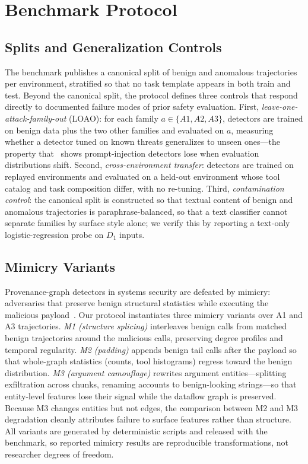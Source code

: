 \section{Benchmark Protocol}
\label{sec:bench}

\subsection{Splits and Generalization Controls}
\label{sec:bench-splits}

The benchmark publishes a canonical split of benign and anomalous trajectories per environment, stratified so that no task template appears in both train and test. Beyond the canonical split, the protocol defines three controls that respond directly to documented failure modes of prior safety evaluation. First, \emph{leave-one-attack-family-out} (LOAO): for each family $a \in \{A1, A2, A3\}$, detectors are trained on benign data plus the two other families and evaluated on $a$, measuring whether a detector tuned on known threats generalizes to unseen ones---the property that~\cite{liu2026passing} shows prompt-injection detectors lose when evaluation distributions shift. Second, \emph{cross-environment transfer}: detectors are trained on replayed environments and evaluated on a held-out environment whose tool catalog and task composition differ, with no re-tuning. Third, \emph{contamination control}: the canonical split is constructed so that textual content of benign and anomalous trajectories is paraphrase-balanced, so that a text classifier cannot separate families by surface style alone; we verify this by reporting a text-only logistic-regression probe on $D_1$ inputs.

\subsection{Mimicry Variants}
\label{sec:bench-mimicry}

Provenance-graph detectors in systems security are defeated by mimicry: adversaries that preserve benign structural statistics while executing the malicious payload~\cite{goyal2023sometimes}. Our protocol instantiates three mimicry variants over A1 and A3 trajectories. \emph{M1 (structure splicing)} interleaves benign calls from matched benign trajectories around the malicious calls, preserving degree profiles and temporal regularity. \emph{M2 (padding)} appends benign tail calls after the payload so that whole-graph statistics (counts, tool histograms) regress toward the benign distribution. \emph{M3 (argument camouflage)} rewrites argument entities---splitting exfiltration across chunks, renaming accounts to benign-looking strings---so that entity-level features lose their signal while the dataflow graph is preserved. Because M3 changes entities but not edges, the comparison between M2 and M3 degradation cleanly attributes failure to surface features rather than structure. All variants are generated by deterministic scripts and released with the benchmark, so reported mimicry results are reproducible transformations, not researcher degrees of freedom.

